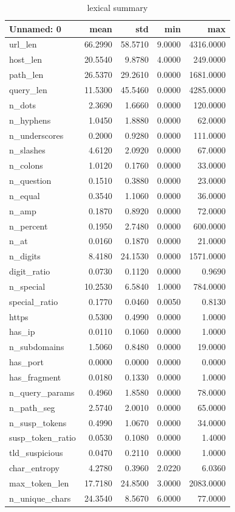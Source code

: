 \begin{table}[htbp]
\caption{lexical summary}
\label{tab:lexical_summary}
\begin{tabular}{lrrrr}
\toprule
Unnamed: 0 & mean & std & min & max \\
\midrule
url\_len & 66.2990 & 58.5710 & 9.0000 & 4316.0000 \\
host\_len & 20.5540 & 9.8780 & 4.0000 & 249.0000 \\
path\_len & 26.5370 & 29.2610 & 0.0000 & 1681.0000 \\
query\_len & 11.5300 & 45.5460 & 0.0000 & 4285.0000 \\
n\_dots & 2.3690 & 1.6660 & 0.0000 & 120.0000 \\
n\_hyphens & 1.0450 & 1.8880 & 0.0000 & 62.0000 \\
n\_underscores & 0.2000 & 0.9280 & 0.0000 & 111.0000 \\
n\_slashes & 4.6120 & 2.0920 & 0.0000 & 67.0000 \\
n\_colons & 1.0120 & 0.1760 & 0.0000 & 33.0000 \\
n\_question & 0.1510 & 0.3880 & 0.0000 & 23.0000 \\
n\_equal & 0.3540 & 1.1060 & 0.0000 & 36.0000 \\
n\_amp & 0.1870 & 0.8920 & 0.0000 & 72.0000 \\
n\_percent & 0.1950 & 2.7480 & 0.0000 & 600.0000 \\
n\_at & 0.0160 & 0.1870 & 0.0000 & 21.0000 \\
n\_digits & 8.4180 & 24.1530 & 0.0000 & 1571.0000 \\
digit\_ratio & 0.0730 & 0.1120 & 0.0000 & 0.9690 \\
n\_special & 10.2530 & 6.5840 & 1.0000 & 784.0000 \\
special\_ratio & 0.1770 & 0.0460 & 0.0050 & 0.8130 \\
https & 0.5300 & 0.4990 & 0.0000 & 1.0000 \\
has\_ip & 0.0110 & 0.1060 & 0.0000 & 1.0000 \\
n\_subdomains & 1.5060 & 0.8480 & 0.0000 & 19.0000 \\
has\_port & 0.0000 & 0.0000 & 0.0000 & 0.0000 \\
has\_fragment & 0.0180 & 0.1330 & 0.0000 & 1.0000 \\
n\_query\_params & 0.4960 & 1.8580 & 0.0000 & 78.0000 \\
n\_path\_seg & 2.5740 & 2.0010 & 0.0000 & 65.0000 \\
n\_susp\_tokens & 0.4990 & 1.0670 & 0.0000 & 34.0000 \\
susp\_token\_ratio & 0.0530 & 0.1080 & 0.0000 & 1.4000 \\
tld\_suspicious & 0.0470 & 0.2110 & 0.0000 & 1.0000 \\
char\_entropy & 4.2780 & 0.3960 & 2.0220 & 6.0360 \\
max\_token\_len & 17.7180 & 24.8500 & 3.0000 & 2083.0000 \\
n\_unique\_chars & 24.3540 & 8.5670 & 6.0000 & 77.0000 \\
\bottomrule
\end{tabular}
\end{table}
